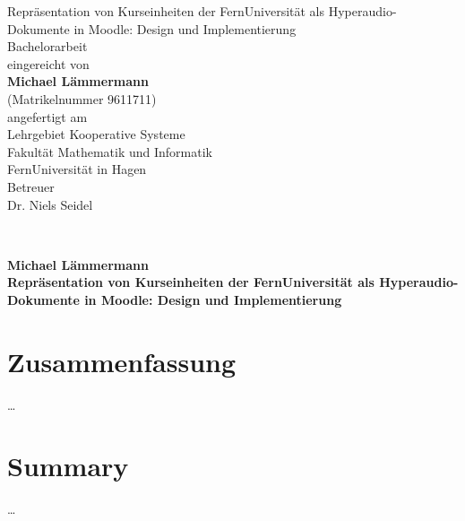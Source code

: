 \documentclass[twoside,bibliography=totoc,openany,numbers=noenddot]{fumi}
\title{\thesistitle}
\author{\thesisauthor}
\date{\today}
\newcommand{\thesistitle}{Repräsentation von Kurseinheiten der FernUniversität als Hyperaudio-Dokumente in Moodle: Design und Implementierung}
\newcommand{\thesisauthor}{Michael Lämmermann}
\newcommand{\thesistype}{Bachelorarbeit} %
\newcommand{\thesismatrikelnummer}{9611711}
\newcommand{\setttsize}[1]{\def\ttsize{#1}}%
\begin{document}
\sffamily
\pagestyle{empty}
\setttsize{\small}




\vspace{2cm}
\begin{center}\LARGE
\vfill
{\Huge\thesistitle}\\
\vfill
\thesistype\\
\vfill
eingereicht von\\[4pt]
\textbf{\thesisauthor}\\[4pt]
(Matrikelnummer \thesismatrikelnummer)\\
\vfill
angefertigt am\\
Lehrgebiet Kooperative Systeme\\
Fakultät Mathematik und Informatik\\
FernUniversität in Hagen\\
\vfill 
Betreuer\\
Dr. Niels Seidel
\vfill
\monthname[\the\month] \the\year
\end{center}
\newpage~\newpage

{\large\textbf{\thesisauthor}\\\textbf{\thesistitle}\vfill}\newpage~\newpage


\section*{Zusammenfassung}
\dots\vfill
\section*{Summary}
\dots\vfill\newpage
\end{document}

